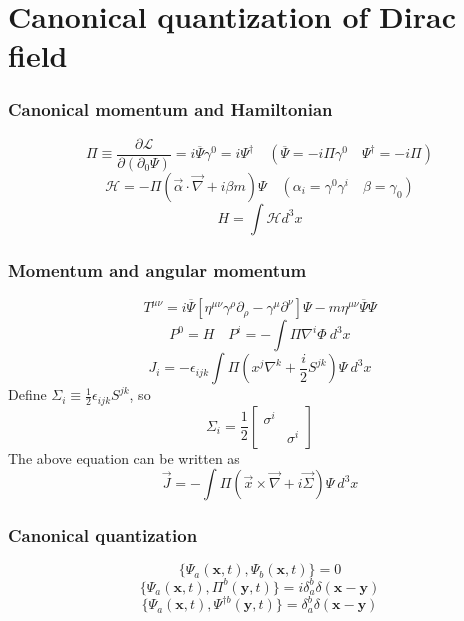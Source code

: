 \documentclass[cyan]{elegantnote}
\begin{document}
\section{Canonical quantization of Dirac field}
\subsubsection{Canonical momentum and Hamiltonian}
\[\Pi \equiv \frac{\partial \mathcal{L}}{\partial(\partial_0 \Psi)} = i \overline{\Psi}\gamma^0 = i \Psi^{\dagger} \quad (\overline{\Psi} = -i \Pi \gamma^0 \quad \Psi^{\dagger} = -i \Pi)\]
\[\mathcal{H} = -\Pi (\vec{\alpha} \cdot \vec{\nabla} + i \beta m)\Psi \quad (\alpha_i = \gamma^0 \gamma^i \quad \beta = \gamma_0)\]
\[H = \int \mathcal{H} d^3x\]
\subsubsection{Momentum and angular momentum}
\[T^{\mu \nu} = i \overline{\Psi} \left[ \eta^{\mu \nu} \gamma^{\rho} \partial_{\rho} - \gamma^{\mu} \partial^{\nu} \right]\Psi -m \eta^{\mu \nu} \overline{\Psi}\Psi\]
\[P^0 = H \quad P^i = -\int \Pi \nabla^i \Phi \: d^3x\]
\[J_i = -\epsilon_{ijk} \int \Pi( x^j \nabla^k + \frac{i}{2} S^{jk}) \Psi  \: d^3x \]
Define $\Sigma_i \equiv \frac{1}{2} \epsilon_{ijk} S^{jk}$, so
\[\Sigma_i = \frac{1}{2}\left[ \begin{matrix} \sigma^i & \\ & \sigma^i \end{matrix} \right] \]
The above equation can be written as
\[\vec{J} = - \int \Pi( \vec{x} \times \vec{\nabla} + i \vec{\Sigma}) \Psi \: d^3x \]
\subsubsection{Canonical quantization}
\[\{\Psi_a(\bm{x},t),\Psi_b(\bm{x},t)\} = 0\]
\[\{\Psi_a(\bm{x},t),\Pi^b(\bm{y},t)\} = i\delta^b_a \delta(\bm{x}-\bm{y})\]
\[\{\Psi_a(\bm{x},t),\Psi^{\dagger b}(\bm{y},t)\} = \delta^b_a \delta(\bm{x}-\bm{y})\]
\end{document}
